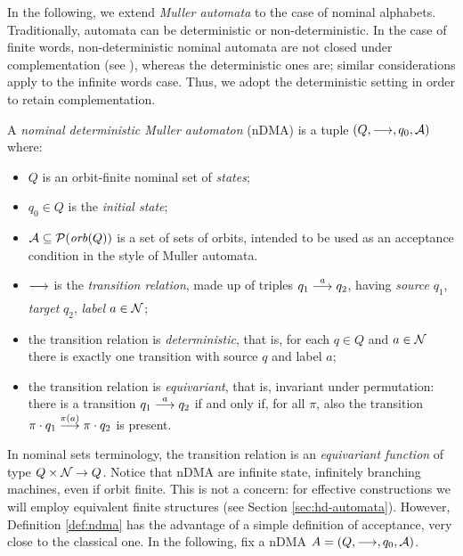 
In the following, we extend \emph{Muller automata} to the case of nominal alphabets. Traditionally, automata can be deterministic or non-deterministic. In the case of finite words, non-deterministic nominal automata are not closed under complementation (see \cite{TODO}), whereas the deterministic ones are; similar considerations apply to the infinite words case. Thus, we adopt the deterministic setting in order to retain complementation.

\begin{definition}\label{def:ndma}
 A \emph{nominal deterministic Muller automaton} (nDMA) is a tuple $(Q,\overset{}{\longrightarrow},q_0,\mathcal{A})$ where:
 
  \begin{itemize}
  \item $Q$ is an orbit-finite nominal set of \emph{states};
  
  \item $q_0 \in Q$ is the \emph{initial state};
  
  \item $\mathcal{A} \subseteq \mathcal{P}(\mathit{orb}(Q))$ is a set of sets of orbits, intended to be used as an acceptance condition in the style of Muller automata.
  
  \item $\overset{}{\underset{}{\longrightarrow}}$ is the \emph{transition relation}, made up of triples $q_1 \overset{a}{\longrightarrow} q_2$, having \emph{source} $q_1$, \emph{target} $q_2$, \emph{label} $a \in \mathcal{N}$;
  
  \item the transition relation is \emph{deterministic}, that is, for each $q \in Q$ and $a \in \mathcal{N}$ there is exactly one transition with source $q$ and label $a$;
  
  \item the transition relation is \emph{equivariant}, that is, invariant under permutation: there is a transition $q_1 \overset{a}{\longrightarrow} q_2$ if and only if, for all $\pi$, also the transition $\pi \cdot q_1 \overset{\pi(a)}{\longrightarrow} \pi \cdot q_2$ is present.
 \end{itemize}
\end{definition}
%
In nominal sets terminology, the transition relation is an \emph{equivariant function} of type $Q \times \mathcal{N} \to Q$.  Notice that nDMA are infinite state, infinitely branching machines, even if orbit finite. This is not a concern: for effective constructions we will employ equivalent finite structures (see Section \ref{sec:hd-automata}). However, Definition \ref{def:ndma} has the advantage of a simple definition of acceptance, very close to the classical one. In the following, fix a nDMA $A=(Q,\overset{}{\longrightarrow},q_0,\mathcal{A})$.


